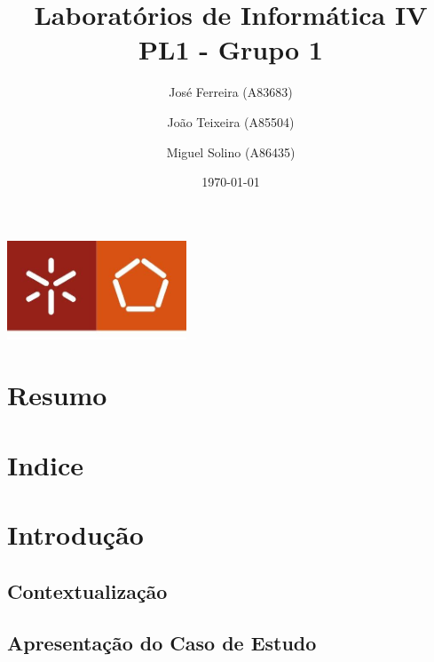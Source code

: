 \documentclass[a4paper]{report}
\begin{document}
\title{Laboratórios de Informática IV\\
\large PL1 - Grupo 1}
\author{José Ferreira (A83683) \and João Teixeira (A85504) \and Miguel Solino (A86435)}
\date{\today}

\begin{center}
    \begin{minipage}{0.75\linewidth}
        \centering
        \includegraphics[width=0.4\textwidth]{images/eng.jpeg}\par\vspace{1cm}
        \vspace{1.5cm}
        \href{https://www.uminho.pt/PT}
        {\color{black}{\scshape\LARGE Universidade do Minho}} \par
        \vspace{1cm}
        \href{https://www.di.uminho.pt/}
        {\color{black}{\scshape\Large Departamento de Informática}} \par
        \vspace{1.5cm}
        \maketitle
    \end{minipage}
\end{center}


\chapter{Resumo}

\chapter{Indice}
\tableofcontents

\chapter{Introdução}
    \section{Contextualização}
    \section{Apresentação do Caso de Estudo}
\end{document}
